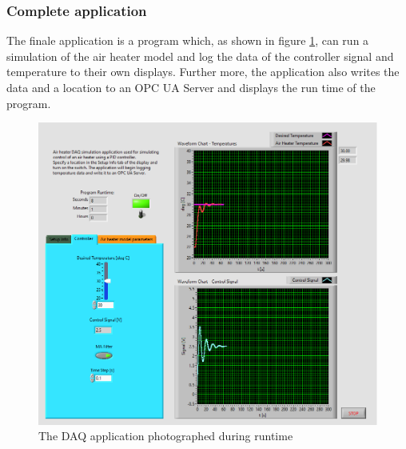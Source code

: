 \documentclass[11pt, A4paper, english]{article}
\numberwithin{equation}{section}
\begin{document}
\begin{multicols}{2}
			\subsubsection{Complete application}
The finale application is a program which, as shown in figure \ref{fig:daq}, can run a simulation of the air heater model and log the data of the controller signal and temperature to their own displays. Further more, the application also writes the data and a location to an OPC UA Server and displays the run time of the program.
				\begin{figure}[H]
\includegraphics[width=\columnwidth]{DAQ.png}
\caption{The DAQ application photographed during runtime}
\label{fig:daq}
				\end{figure}
		

\end{multicols}
\end{document}
